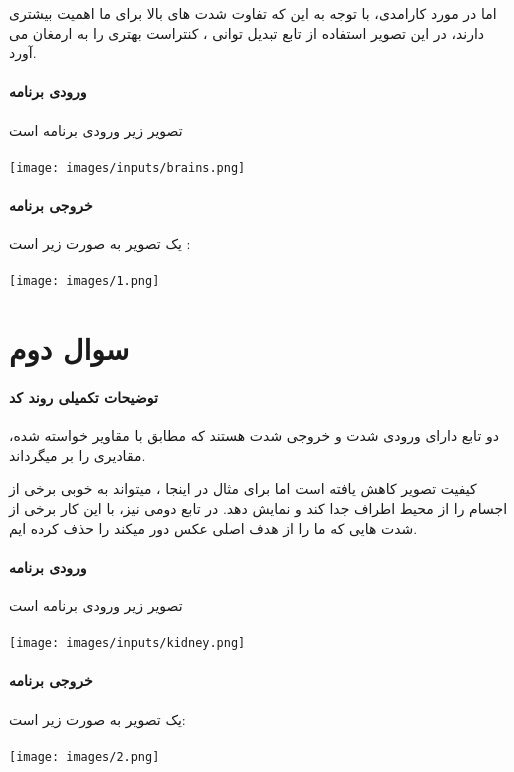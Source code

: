 \documentclass[12pt]{article}
\begin{document}
		
		اما در مورد کارامدی، با توجه به این که تفاوت شدت های بالا برای ما اهمیت بیشتری دارند، در این تصویر استفاده از تابع تبدیل توانی ، کنتراست بهتری را به ارمغان می آورد. 
		\paragraph{ورودی برنامه}
		تصویر زیر ورودی برنامه است \\
		\vspace{0.5cm}\\
		\texttt{[image: images/inputs/brains.png]}
		\paragraph{خروجی برنامه}
		یک تصویر به صورت زیر است :\\
		\vspace{0.5cm}\\
		\texttt{[image: images/1.png]}
		\newpage
		\section{سوال دوم }
		\paragraph{توضیحات تکمیلی روند کد}
		دو تابع 
		دارای ورودی شدت و خروجی شدت هستند که مطابق با مقاویر خواسته شده، مقادیری را بر میگرداند.
		
		کیفیت تصویر کاهش یافته است اما برای مثال در اینجا ، میتواند به خوبی برخی از اجسام را از محیط اطراف جدا کند و نمایش دهد.
		در تابع دومی نیز، با این کار برخی از شدت هایی که ما را از هدف اصلی عکس دور میکند را حذف کرده ایم.
		
		
		
		\paragraph{ورودی برنامه}
		تصویر زیر ورودی برنامه است \\
		\vspace{0.5cm}\\
		\texttt{[image: images/inputs/kidney.png]}
		\paragraph{خروجی برنامه}
			یک تصویر به صورت زیر است:\\
		\vspace{0.5cm}\\
		\texttt{[image: images/2.png]}
		\newpage
\end{document}
